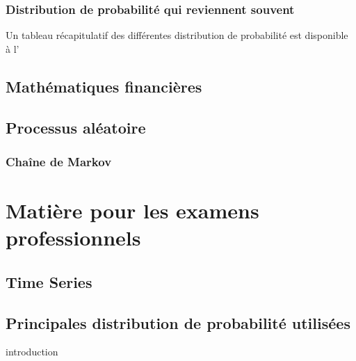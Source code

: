 \documentclass[12pt, french]{report}
\begin{document}
\section{Distribution de probabilité qui reviennent souvent}
Un tableau récapitulatif des différentes distribution de probabilité est disponible à l'


\chapter{Mathématiques financières}


\chapter{Processus aléatoire}

\section{Chaîne de Markov}
\label{sec:chaine-markov}



\part{Matière pour les examens professionnels}

\chapter{Time Series}

\label{sec:Serie-Chronologique}



\appendix
\chapter{Principales distribution de probabilité utilisées}
introduction
\end{document}
